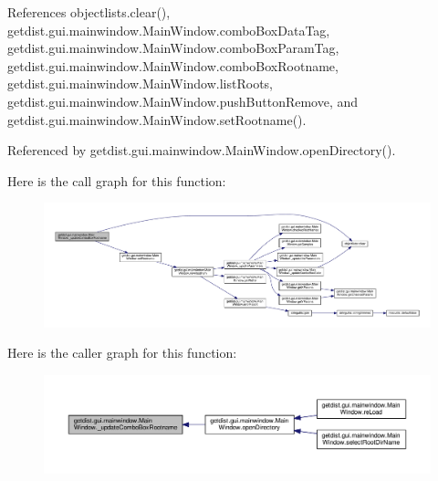 References objectlists.\+clear(), getdist.\+gui.\+mainwindow.\+Main\+Window.\+combo\+Box\+Data\+Tag, getdist.\+gui.\+mainwindow.\+Main\+Window.\+combo\+Box\+Param\+Tag, getdist.\+gui.\+mainwindow.\+Main\+Window.\+combo\+Box\+Rootname, getdist.\+gui.\+mainwindow.\+Main\+Window.\+list\+Roots, getdist.\+gui.\+mainwindow.\+Main\+Window.\+push\+Button\+Remove, and getdist.\+gui.\+mainwindow.\+Main\+Window.\+set\+Rootname().



Referenced by getdist.\+gui.\+mainwindow.\+Main\+Window.\+open\+Directory().

Here is the call graph for this function\+:
\nopagebreak
\begin{figure}[H]
\begin{center}
\leavevmode
\includegraphics[width=350pt]{classgetdist_1_1gui_1_1mainwindow_1_1MainWindow_a2577966dbd8821764a2880b0883cd0c6_cgraph}
\end{center}
\end{figure}
Here is the caller graph for this function\+:
\nopagebreak
\begin{figure}[H]
\begin{center}
\leavevmode
\includegraphics[width=350pt]{classgetdist_1_1gui_1_1mainwindow_1_1MainWindow_a2577966dbd8821764a2880b0883cd0c6_icgraph}
\end{center}
\end{figure}
\mbox{\label{classgetdist_1_1gui_1_1mainwindow_1_1MainWindow_a4136dbf5a3f107c064a7b5a58c4dcdb7}} 
